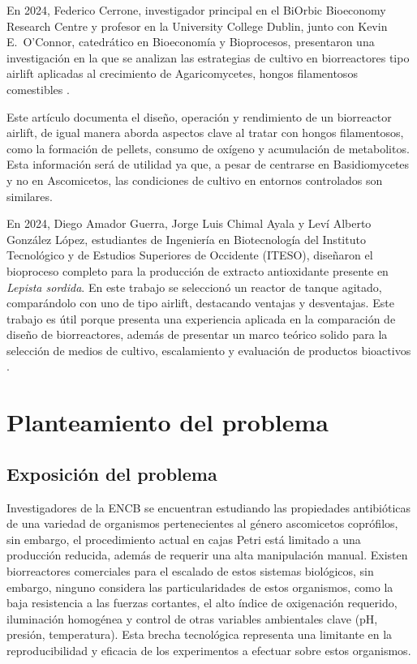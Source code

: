 \documentclass[11pt,tesis,twoside,openright,spanish]{upiiztt}
\begin{document}
En 2024, Federico Cerrone, investigador principal en el BiOrbic Bioeconomy
Research Centre y profesor en la University College Dublin, junto con Kevin E.\
O'Connor, catedrático en Bioeconomía y Bioprocesos, presentaron una
investigación en la que se analizan las estrategias de cultivo en biorreactores tipo
airlift aplicadas al crecimiento de Agaricomycetes, hongos filamentosos comestibles \cite{Cerrone2024}.

Este artículo documenta el diseño, operación y rendimiento de un biorreactor airlift,
de igual manera aborda aspectos clave al tratar con hongos filamentosos, como la
formación de pellets, consumo de oxígeno y acumulación de metabolitos. Esta
información será de utilidad ya que, a pesar de centrarse en Basidiomycetes y no
en Ascomicetos, las condiciones de cultivo en entornos controlados son similares.

En 2024, Diego Amador Guerra, Jorge Luis Chimal Ayala y Leví Alberto González
López, estudiantes de Ingeniería en Biotecnología del Instituto Tecnológico y de
Estudios Superiores de Occidente (ITESO), diseñaron el bioproceso completo para
la producción de extracto antioxidante presente en \textit{Lepista sordida}. En este trabajo
se seleccionó un reactor de tanque agitado, comparándolo con uno de tipo airlift,
destacando ventajas y desventajas. Este trabajo es útil porque presenta una
experiencia aplicada en la comparación de diseño de biorreactores, además de
presentar un marco teórico solido para la selección de medios de cultivo,
escalamiento y evaluación de productos bioactivos \cite{Amador2024}.

\chapter{Planteamiento del problema}\label{cap6}

\section{Exposición del problema}

Investigadores de la ENCB se encuentran estudiando las propiedades antibióticas
de una variedad de organismos pertenecientes al género ascomicetos coprófilos,
sin embargo, el procedimiento actual en cajas Petri está limitado a una producción
reducida, además de requerir una alta manipulación manual. Existen biorreactores
comerciales para el escalado de estos sistemas biológicos, sin embargo, ninguno
considera las particularidades de estos organismos, como la baja resistencia a las
fuerzas cortantes, el alto índice de oxigenación requerido, iluminación homogénea
y control de otras variables ambientales clave (pH, presión, temperatura). Esta
brecha tecnológica representa una limitante en la reproducibilidad y eficacia de los
experimentos a efectuar sobre estos organismos.
\end{document}
